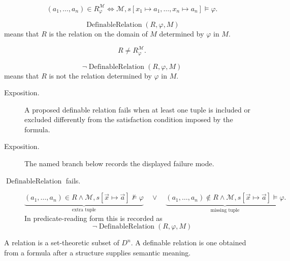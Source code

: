 \begin{remark*}
\[
(a_1,\ldots,a_n)\in R_{\varphi}^{\mathcal M}
\Longleftrightarrow
\mathcal M,s[x_1\mapsto a_1,\ldots,x_n\mapsto a_n]\models\varphi.
\]
\end{remark*}

\begin{remark*}
\[
  \operatorname{DefinableRelation}(R,\varphi,M)
\] means that \(R\) is the
relation on the domain of \(M\) determined by \(\varphi\) in \(M\).
\end{remark*}

\begin{remark*}
\[
R\neq R_{\varphi}^{\mathcal M}.
\]
\end{remark*}

\begin{remark*}
\[
  \neg\operatorname{DefinableRelation}(R,\varphi,M)
\] means that \(R\) is not
the relation determined by \(\varphi\) in \(M\).
\end{remark*}

\begin{remark*}
\begin{description}
  \item[Exposition.] A proposed definable relation fails when at least one tuple is included or
excluded differently from the satisfaction condition imposed by the formula.
\end{description}
\end{remark*}

\begin{remark*}
\begin{description}
  \item[Exposition.] The named branch below records the displayed failure mode.
\item[\(\operatorname{DefinableRelation}\) fails.] \[
\underbrace{(a_1,\ldots,a_n)\in R \land
\mathcal M,s[\vec x\mapsto\vec a]\not\models\varphi}_{\text{extra tuple}}
\quad\lor\quad
\underbrace{(a_1,\ldots,a_n)\notin R \land
\mathcal M,s[\vec x\mapsto\vec a]\models\varphi}_{\text{missing tuple}}.
\]
  In predicate-reading form this is recorded as
  \[
    \neg\operatorname{DefinableRelation}(R,\varphi,M)
  \]
\end{description}
\end{remark*}

\begin{remark*}[Interpretation]
A relation is a set-theoretic subset of \(D^n\). A definable relation is one
obtained from a formula after a structure supplies semantic meaning.
\end{remark*}

